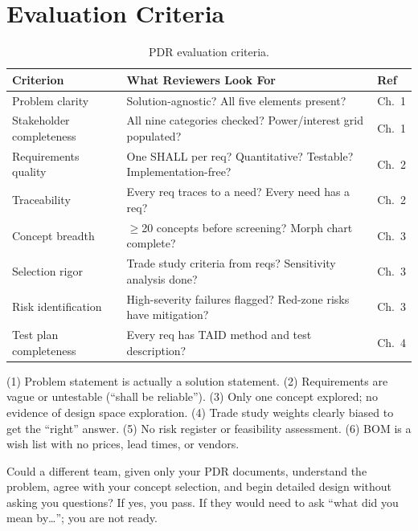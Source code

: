 \section{Evaluation Criteria}

\begin{table}[htbp]\centering\small
\begin{tabularx}{\textwidth}{l X l}
\toprule
\textbf{Criterion} & \textbf{What Reviewers Look For} & \textbf{Ref} \\
\midrule
Problem clarity & Solution-agnostic? All five elements present? & Ch.~1 \\
Stakeholder completeness & All nine categories checked? Power/interest grid populated? & Ch.~1 \\
Requirements quality & One SHALL per req? Quantitative? Testable? Implementation-free? & Ch.~2 \\
Traceability & Every req traces to a need? Every need has a req? & Ch.~2 \\
Concept breadth & $\geq$20 concepts before screening? Morph chart complete? & Ch.~3 \\
Selection rigor & Trade study criteria from reqs? Sensitivity analysis done? & Ch.~3 \\
Risk identification & High-severity failures flagged? Red-zone risks have mitigation? & Ch.~3 \\
Test plan completeness & Every req has TAID method and test description? & Ch.~4 \\
\bottomrule
\end{tabularx}
\caption{PDR evaluation criteria.}
\end{table}

\begin{tipbox}
(1) Problem statement is actually a solution statement. (2) Requirements are vague or untestable (``shall be reliable''). (3) Only one concept explored; no evidence of design space exploration. (4) Trade study weights clearly biased to get the ``right'' answer. (5) No risk register or feasibility assessment. (6) BOM is a wish list with no prices, lead times, or vendors.
\end{tipbox}

\begin{tipbox}
Could a different team, given only your PDR documents, understand the problem, agree with your concept selection, and begin detailed design without asking you questions? If yes, you pass. If they would need to ask ``what did you mean by\ldots''; you are not ready.
\end{tipbox}

